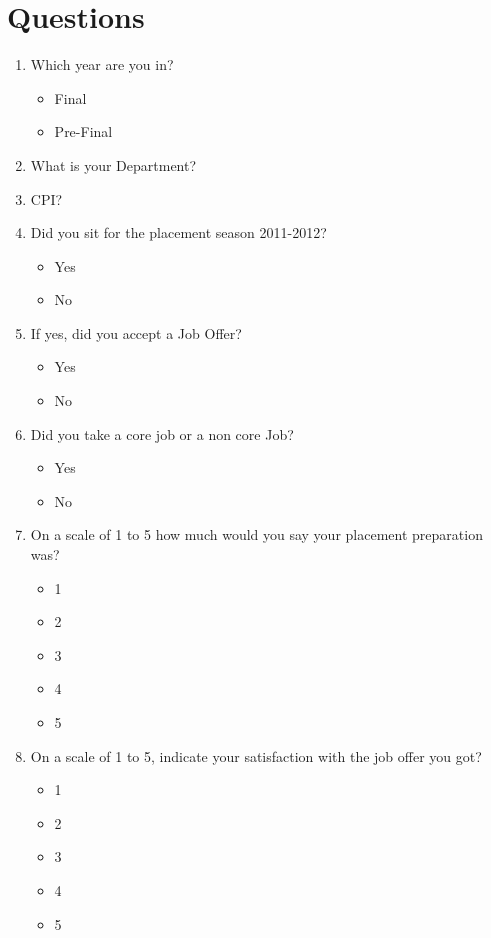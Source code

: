 \documentclass[a4paper,12pt]{report}
\begin{document}
\section{Questions}
\begin{enumerate}
 \item Which year are you in?
  \begin{itemize}
   \item Final
   \item Pre-Final
  \end{itemize}
 \item What is your Department?
 \item CPI?
 \item Did you sit for the placement season 2011-2012?
  \begin{itemize}
   \item Yes
   \item No
  \end{itemize}
 \item If yes, did you accept a Job Offer?
  \begin{itemize}
   \item Yes
   \item No
  \end{itemize}
 \item Did you take a core job or a non core Job?
  \begin{itemize}
   \item Yes
   \item No
  \end{itemize}
 \item On a scale of 1 to 5 how much would you say your placement preparation was?
  \begin{multicols}{5}
  \begin{itemize}
   \item 1
   \item 2
   \item 3
   \item 4
   \item 5
  \end{itemize}
  \end{multicols}
 \item On a scale of 1 to 5, indicate your satisfaction with the job offer you got?
  \begin{multicols}{5}
  \begin{itemize}
   \item 1
   \item 2
   \item 3
   \item 4
   \item 5
  \end{itemize}
  \end{multicols}
\end{enumerate}
\end{document}
